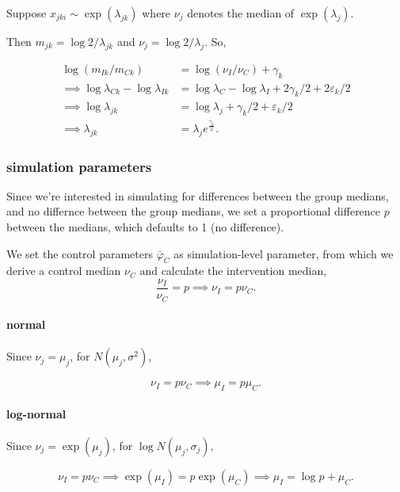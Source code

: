 \documentclass[]{article}
\let\oldparagraph\paragraph
\renewcommand{\paragraph}[1]{\oldparagraph{#1}\mbox{}}
\begin{document}
Suppose \(x_{jki} \sim \exp(\lambda_{jk})\) where \(\nu_j\) denotes the
median of \(\exp(\lambda_j)\).

Then \(m_{jk} = \log2/\lambda_{jk}\) and \(\nu_j = \log2/\lambda_j\).
So,

\begin{align*}
\log(m_{Ik}/m_{Ck}) &= \log(\nu_I/\nu_C) + \gamma_k \\
\implies \log\lambda_{Ck} - \log\lambda_{Ik} &= \log\lambda_C - \log\lambda_I + 2\gamma_k/2 + 2\varepsilon_k/2\\
\implies \log\lambda_{jk} &= \log\lambda_j + \gamma_k/2 + \varepsilon_k/2\\
\implies \lambda_{jk} &= \lambda_j e^{\frac{\gamma_k}{2}}.
\end{align*}

\hypertarget{simulation-parameters}{%
\subsubsection{simulation parameters}\label{simulation-parameters}}

Since we're interested in simulating for differences between the group
medians, and no differnce between the group medians, we set a
proportional difference \(p\) between the medians, which defaults to 1
(no difference).

We set the control parameters \(\bar \varphi_C\) as simulation-level
parameter, from which we derive a control median \(\nu_C\) and calculate
the intervention median, \[
\frac{\nu_I}{\nu_C} = p \implies \nu_I = p\nu_C.
\]

\hypertarget{normal-1}{%
\paragraph{normal}\label{normal-1}}

Since \(\nu_j = \mu_j\), for \(N(\mu_j, \sigma^2)\),

\[
\nu_I = p \nu_C \implies \mu_I = p \mu_C.
\]

\hypertarget{log-normal-1}{%
\paragraph{log-normal}\label{log-normal-1}}

Since \(\nu_j = \exp(\mu_j)\), for \(\log N(\mu_j, \sigma_j)\),

\[
\nu_I = p \nu_C \implies \exp(\mu_I) = p \exp(\mu_C) \implies \mu_I = \log p + \mu_C. 
\]
\end{document}
